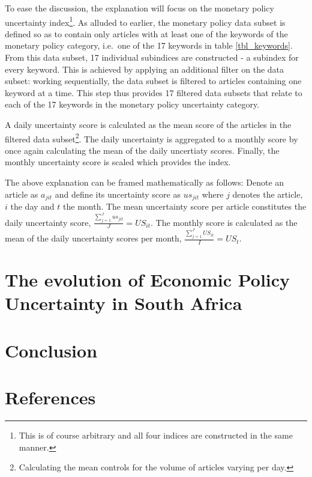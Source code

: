\documentclass[11pt,preprint, authoryear]{elsarticle}
\numberwithin{equation}{section}
\numberwithin{figure}{section}
\numberwithin{table}{section}
\let\rmarkdownfootnote\footnote%
\def\footnote{\protect\rmarkdownfootnote}
\begin{document}
To ease the discussion, the explanation will focus on the monetary
policy uncertainty index\footnote{This is of course arbitrary and all
  four indices are constructed in the same manner.}. As alluded to
earlier, the monetary policy data subset is defined so as to contain
only articles with at least one of the keywords of the monetary policy
category, i.e.~one of the 17 keywords in table \ref{tbl_keywords}. From
this data subset, 17 individual subindices are constructed - a subindex
for every keyword. This is achieved by applying an additional filter on
the data subset: working sequentially, the data subset is filtered to
articles containing one keyword at a time. This step thus provides 17
filtered data subsets that relate to each of the 17 keywords in the
monetary policy uncertainty category.

A daily uncertainty score is calculated as the mean score of the
articles in the filtered data subset\footnote{Calculating the mean
  controls for the volume of articles varying per day.}. The daily
uncertainty is aggregated to a monthly score by once again calculating
the mean of the daily uncertiaty scores. Finally, the monthly
uncertainty score is scaled which provides the index.

The above explanation can be framed mathematically as follows: Denote an
article as \(a_{jit}\) and define its uncertainty score as \(us_{jit}\)
where \(j\) denotes the article, \(i\) the day and \(t\) the month. The
mean uncertainty score per article constitutes the daily uncertainty
score, \(\frac{\sum_{j=1}^Jus_{jit}}{J}= US_{it}\). The monthly score is
calculated as the mean of the daily uncertainty scores per month,
\(\frac{\sum_{j=1}^JUS_{it}}{I}= US_{t}\).

\section{\texorpdfstring{The evolution of Economic Policy Uncertainty in
South Africa
\label{sec_discuss}}{The evolution of Economic Policy Uncertainty in South Africa }}\label{the-evolution-of-economic-policy-uncertainty-in-south-africa}

\section{\texorpdfstring{Conclusion
\label{sec_conclude}}{Conclusion }}\label{conclusion}

\newpage

\section*{References}\label{references}
\end{document}
